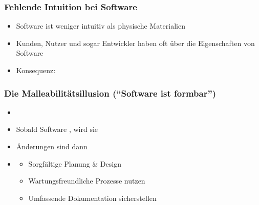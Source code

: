 \subsubsection*{Fehlende Intuition bei Software}
\begin{itemize}
    \item Software ist weniger intuitiv als physische Materialien
    \item Kunden, Nutzer und sogar Entwickler haben oft  über die Eigenschaften von Software
    \item Konsequenz: 
\end{itemize}
\subsubsection*{Die Malleabilitätsillusion (\enquote{Software ist formbar})}
\begin{itemize}
    \item {}
    \item Sobald Software , wird sie 
    \item Änderungen sind dann 
    \item {}
    \begin{itemize}
        \item Sorgfältige Planung \& Design
        \item Wartungsfreundliche Prozesse nutzen
        \item Umfassende Dokumentation sicherstellen
    \end{itemize}
\end{itemize}
